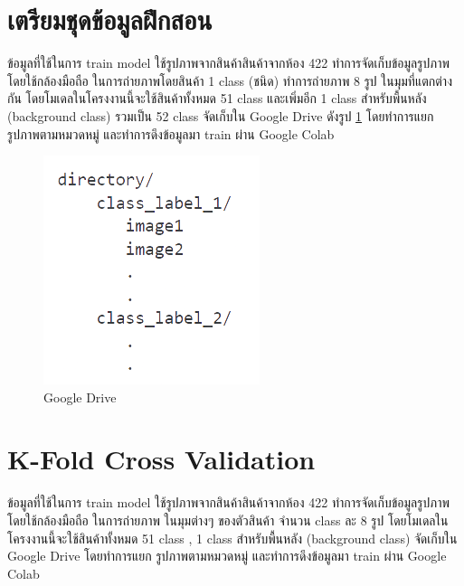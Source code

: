  

\section{เตรียมชุดข้อมูลฝึกสอน}
ข้อมูลที่ใช้ในการ train model ใช้รูปภาพจากสินค้าสินค้าจากห้อง 422  ทำการจัดเก็บข้อมูลรูปภาพ โดยใช้กล้องมือถือ
ในการถ่ายภาพโดยสินค้า 1 class (ชนิด) ทำการถ่ายภาพ 8 รูป ในมุมที่แตกต่างกัน  
โดยโมเดลในโครงงานนี้จะใช้สินค้าทั้งหมด 51 class และเพิ่มอีก 1 class สำหรับพื้นหลัง (background class)
รวมเป็น 52 class
จัดเก็บใน Google Drive ดังรูป  \ref{fig:Google Drive} โดยทำการแยก รูปภาพตามหมวดหมู่ และทำการดึงข้อมูลมา train ผ่าน Google Colab 
\begin{figure}[h]
  \begin{center}
   
  \includegraphics[scale=0.4]{pic/st.png}
  \end{center}
  
  \caption[Google Drive]{Google Drive}
  \label{fig:Google Drive}
  \end{figure}

\section{K-Fold Cross Validation}
ข้อมูลที่ใช้ในการ train model ใช้รูปภาพจากสินค้าสินค้าจากห้อง 422  ทำการจัดเก็บข้อมูลรูปภาพ โดยใช้กล้องมือถือ ในการถ่ายภาพ ในมุมต่างๆ
ของตัวสินค้า จำนวน class ละ 8 รูป โดยโมเดลในโครงงานนี้จะใช้สินค้าทั้งหมด 51 class , 1 class สำหรับพื้นหลัง (background class)
จัดเก็บใน Google Drive โดยทำการแยก รูปภาพตามหมวดหมู่ และทำการดึงข้อมูลมา train ผ่าน Google Colab
   
  
